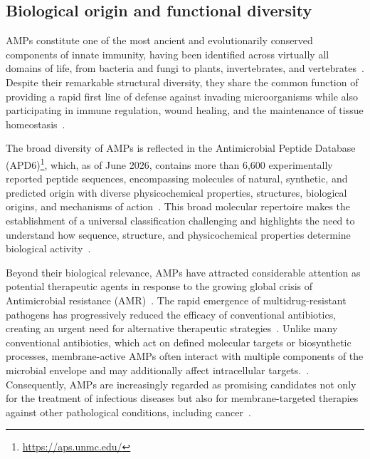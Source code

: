 \subsection{Biological origin and functional diversity}

AMPs constitute one of the most ancient and evolutionarily conserved components of innate immunity, having been identified across virtually all domains of life, from bacteria and fungi to plants, invertebrates, and vertebrates~\cite{Hancock2006,Kumar2018,fermentation10110540,microorganisms13112574}. Despite their remarkable structural diversity, they share the common function of providing a rapid first line of defense against invading microorganisms while also participating in immune regulation, wound healing, and the maintenance of tissue homeostasis~\cite{Hancock2006,Kumar2018}.

The broad diversity of AMPs is reflected in the Antimicrobial Peptide Database (APD6)\footnote{\url{https://aps.unmc.edu/}}, which, as of June 2026, contains more than 6,600 experimentally reported peptide sequences, encompassing molecules of natural, synthetic, and predicted origin with diverse physicochemical properties, structures, biological origins, and mechanisms of action~\cite{APD6,Wang2016}. This broad molecular repertoire makes the establishment of a universal classification challenging and highlights the need to understand how sequence, structure, and physicochemical properties determine biological activity~\cite{Huan2020}.


Beyond their biological relevance, AMPs have attracted considerable attention as potential therapeutic agents in response to the growing global crisis of Antimicrobial resistance (AMR)~\cite{WEISBERG2026102781,ho2025antimicrobial}. The rapid emergence of multidrug-resistant pathogens has progressively reduced the efficacy of conventional antibiotics, creating an urgent need for alternative therapeutic strategies~\cite{salam2023antimicrobial,macnair2024alternative}. Unlike many conventional antibiotics, which act on defined molecular targets or biosynthetic processes, membrane-active AMPs often interact with multiple components of the microbial envelope and may additionally affect intracellular targets.~\cite{microorganisms13112574,Huan2020}. Consequently, AMPs are increasingly regarded as promising candidates not only for the treatment of infectious diseases but also for membrane-targeted therapies against other pathological conditions, including cancer~\cite{torres2020wasp}.






